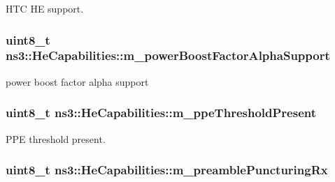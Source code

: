 H\+TC HE support. 

\subsubsection[{\texorpdfstring{m\+\_\+power\+Boost\+Factor\+Alpha\+Support}{m_powerBoostFactorAlphaSupport}}]{\setlength{\rightskip}{0pt plus 5cm}uint8\+\_\+t ns3\+::\+He\+Capabilities\+::m\+\_\+power\+Boost\+Factor\+Alpha\+Support\hspace{0.3cm}{\ttfamily [private]}}\hypertarget{classns3_1_1HeCapabilities_ab121dcfc4c94858e252398cc7a060827}{}\label{classns3_1_1HeCapabilities_ab121dcfc4c94858e252398cc7a060827}


power boost factor alpha support 

\subsubsection[{\texorpdfstring{m\+\_\+ppe\+Threshold\+Present}{m_ppeThresholdPresent}}]{\setlength{\rightskip}{0pt plus 5cm}uint8\+\_\+t ns3\+::\+He\+Capabilities\+::m\+\_\+ppe\+Threshold\+Present\hspace{0.3cm}{\ttfamily [private]}}\hypertarget{classns3_1_1HeCapabilities_ab1fa615dfa8a62f7080232e58dbde1c0}{}\label{classns3_1_1HeCapabilities_ab1fa615dfa8a62f7080232e58dbde1c0}


P\+PE threshold present. 

\subsubsection[{\texorpdfstring{m\+\_\+preamble\+Puncturing\+Rx}{m_preamblePuncturingRx}}]{\setlength{\rightskip}{0pt plus 5cm}uint8\+\_\+t ns3\+::\+He\+Capabilities\+::m\+\_\+preamble\+Puncturing\+Rx\hspace{0.3cm}{\ttfamily [private]}}\hypertarget{classns3_1_1HeCapabilities_ad180538f4dd3e4c2b1e8aadf36a0075c}{}\label{classns3_1_1HeCapabilities_ad180538f4dd3e4c2b1e8aadf36a0075c}


